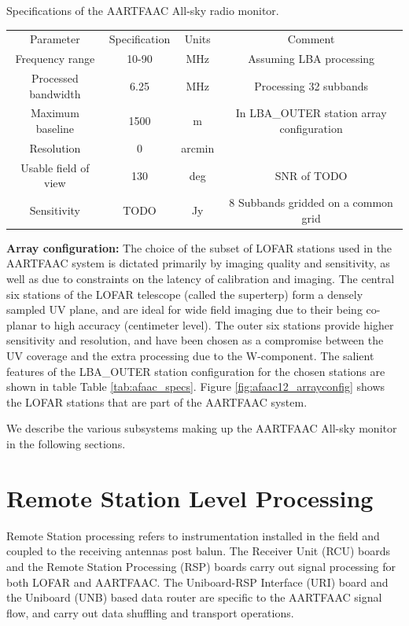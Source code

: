 \documentclass{ws-jai}
\begin{document}
\begin{wstable}[h]
\caption{Specifications of the AARTFAAC All-sky radio monitor.}
\begin{tabular}{@{}cccc@{}} \toprule
Parameter & Specification & Units & Comment\\ \colrule
Frequency range & 10-90 & MHz & Assuming LBA processing  \\
Processed bandwidth & 6.25 & MHz & Processing 32 subbands \\
Maximum baseline & 1500 & m & In LBA\_OUTER station array configuration\\
Resolution & 0 & arcmin & \\
Usable field of view & 130 & deg & SNR of TODO \\
Sensitivity & TODO & Jy & 8 Subbands gridded on a common grid \\

\end{tabular}
\label{tab:afaac_specs}
\end{wstable}

\noindent  \textbf {Array  configuration:} The  choice  of the  subset of  LOFAR
stations used  in the AARTFAAC system  is dictated primarily by  imaging quality
and sensitivity, as well as due to constraints on the latency of calibration and
imaging. The central six stations of  the LOFAR telescope (called the superterp)
form a  densely sampled UV plane,  and are ideal  for wide field imaging  due to
their  being co-planar  to  high  accuracy (centimeter  level).   The outer  six
stations provide  higher sensitivity and resolution,  and have been chosen  as a
compromise  between  the  UV  coverage  and the  extra  processing  due  to  the
W-component.  The salient  features of the LBA\_OUTER  station configuration for
the  chosen stations  are shown  in table  Table \ref{tab:afaac_specs}.   Figure
\ref{fig:afaac12_arrayconfig}  shows the  LOFAR stations  that are  part of  the
AARTFAAC system.

We describe the various subsystems making up the AARTFAAC All-sky monitor in the
following sections.

\section {\label{sec:station_hardware} Remote Station Level Processing} 
Remote Station processing  refers to instrumentation installed in  the field and
coupled to the receiving antennas post balun. The Receiver Unit (RCU) boards and
the Remote Station Processing (RSP) boards  carry out signal processing for both
LOFAR and  AARTFAAC.  The  Uniboard-RSP Interface (URI)  board and  the Uniboard
(UNB) based data router are specific to  the AARTFAAC signal flow, and carry out
data shuffling and transport operations.\\
\end{document}
